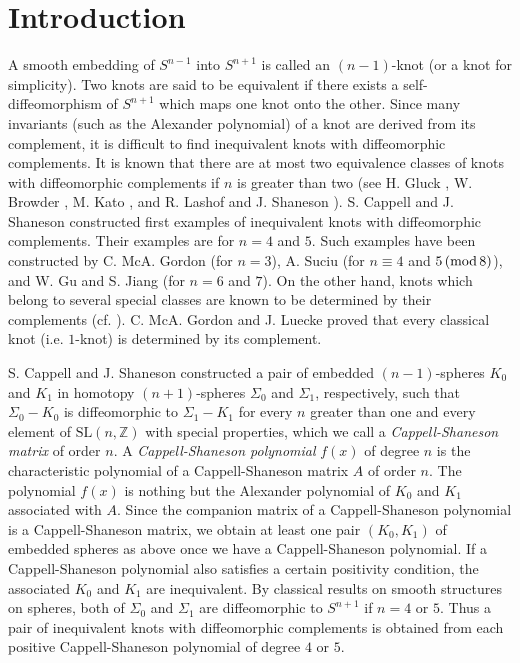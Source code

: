 \documentclass{amsart}
\theoremstyle{plain}
\theoremstyle{definition}
\theoremstyle{remark}
\newcommand{\cb}{}
\begin{document}

\section{Introduction}



A smooth embedding of $S^{n-1}$ into $S^{n+1}$ is called 
an $(n-1)$-knot (or a knot for simplicity). 
Two knots are said to be equivalent if there exists a self-diffeomorphism of $S^{n+1}$ which maps 
one knot onto the other. 
Since many invariants (such as the Alexander polynomial) of a knot are derived from its complement, 
it is difficult to find inequivalent knots with diffeomorphic complements. 
It is known that there are at most two equivalence classes of knots 
with diffeomorphic complements if $n$ is greater than two (see H. Gluck \cite{Gluck1962},
W. Browder \cite{Browder1967}, M. Kato \cite{Kato1969}, and R. Lashof and J. Shaneson \cite{LS1969}).
S. Cappell and J. Shaneson \cite{CS1976}
constructed first examples of inequivalent knots with diffeomorphic complements. 
Their examples are for $n=4$ and $5$. 
Such examples have been constructed by C. McA. Gordon \cite{Gordon1976} (for $n=3$),
A. Suciu \cite{Suciu1992} (for $n\equiv 4$ and $5 \, ({\rm mod}\, 8)$),
and W. Gu and S. Jiang \cite{GJ1999} (for $n=6$ and $7$).
On the other hand, 
knots which belong to several special classes are known to be determined by their complements 
(cf. \cite[Section 1]{Suciu1992}). 
C. McA. Gordon and J. Luecke \cite{GL1989} proved that every classical knot (i.e. $1$-knot) is determined
by its complement. 

S. Cappell and J. Shaneson \cite{CS1976} constructed a pair of embedded $(n-1)$-spheres $K_0$ and $K_1$
in homotopy $(n+1)$-spheres $\Sigma_0$ and $\Sigma_1$, respectively, 
such that $\Sigma_0-K_0$ is diffeomorphic to $\Sigma_1-K_1$ 
for every $n$ greater than one and every element of $\mathrm{SL}(n,\mathbb{Z})$ with special properties, 
which we call a {\it Cappell-Shaneson matrix} of order $n$. 
A {\it Cappell-Shaneson polynomial} $f(x)$ of degree $n$ is the characteristic polynomial of 
a Cappell-Shaneson matrix $A$ of order $n$. 
The polynomial $f(x)$ is nothing but the Alexander polynomial of $K_0$ and $K_1$ associated with $A$. 
Since the companion matrix of a Cappell-Shaneson polynomial is a Cappell-Shaneson matrix, 
we obtain at least one pair $(K_0,K_1)$ of embedded spheres as above 
once we have a Cappell-Shaneson polynomial. 
If a Cappell-Shaneson polynomial also satisfies a
{\cb
certain
}
positivity condition,
the associated $K_0$ and $K_1$ are inequivalent. 
By classical results on smooth structures on spheres, 
both of $\Sigma_0$ and $\Sigma_1$ are diffeomorphic to $S^{n+1}$ if $n=4$ or $5$. 
Thus a pair of inequivalent knots with diffeomorphic complements is obtained from 
each positive Cappell-Shaneson polynomial of degree $4$ or $5$. 
\end{document}
